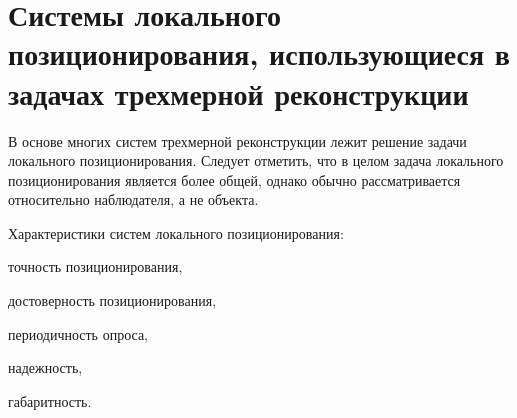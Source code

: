 \section{Системы локального позиционирования, использующиеся в задачах трехмерной реконструкции}
\label{sec_3d_models_positioning}

В основе многих систем трехмерной реконструкции лежит решение задачи локального позиционирования. Следует отметить, что в целом задача локального позиционирования является более общей, однако обычно рассматривается относительно наблюдателя, а не объекта.

\begin{SCn}
\end{SCn}

Характеристики систем локального позиционирования:
\begin{textitemize}
    \item точность позиционирования,
    \item достоверность позиционирования,
    \item периодичность опроса,
    \item надежность,
    \item габаритность.
\end{textitemize}

